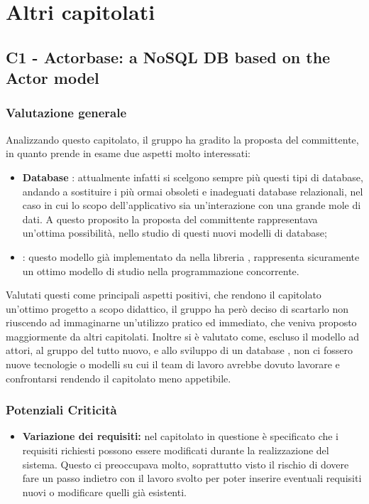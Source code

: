\section{Altri capitolati}

\subsection{C1 - Actorbase: a NoSQL DB based on the Actor model}
\subsubsection{Valutazione generale}
Analizzando questo capitolato, il gruppo ha gradito la proposta del committente, in quanto prende in esame due aspetti molto interessati:
\begin{itemize}
	\item \textbf{Database }: attualmente infatti si scelgono sempre pi\`u questi tipi di database, andando a sostituire i pi\`u ormai obsoleti e inadeguati database relazionali, nel caso in cui lo scopo dell'applicativo sia un'interazione con una grande mole di dati.
	A questo proposito la proposta del committente rappresentava un'ottima possibilit\`a, nello studio di questi nuovi modelli di database;
	\item \textbf{}: questo modello gi\`a implementato da nella libreria , rappresenta sicuramente un ottimo modello di studio nella programmazione concorrente.
\end{itemize}
Valutati questi come principali aspetti positivi, che rendono il capitolato un'ottimo progetto a scopo didattico, il gruppo ha per\`o deciso di scartarlo non riuscendo ad immaginarne un'utilizzo pratico ed immediato, che veniva proposto maggiormente da altri capitolati.
Inoltre si \`e valutato come, escluso il modello ad attori, al gruppo del tutto nuovo, e allo sviluppo di un database , non ci fossero nuove tecnologie o modelli su cui il team di lavoro avrebbe dovuto lavorare e confrontarsi rendendo il capitolato meno appetibile.  

\subsubsection{Potenziali Criticità}

\begin{itemize}
	\item \textbf{Variazione dei requisiti:} nel capitolato in questione è specificato che i requisiti richiesti possono essere modificati durante la realizzazione del sistema. Questo ci preoccupava molto, soprattutto visto il rischio di dovere fare un passo indietro con il lavoro svolto per poter inserire eventuali requisiti nuovi o modificare quelli già esistenti.
\end{itemize}


